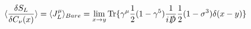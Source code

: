 \begin{equation}
\langle {{\delta S_L}\over{\delta C_{\nu}(x)}}\rangle =\langle
J^\mu_L \rangle_{Bare} =\lim_{x \rightarrow y} {\rm
Tr}\{\gamma^\mu\frac{1}{2}(1-\gamma^5)
{1\over{i{D\kern-0.15em\raise0.17ex\llap{/}\kern0.15em\relax}}}
\frac{1}{2}(1-\sigma^3)\delta(x-y)\}
\end{equation}

